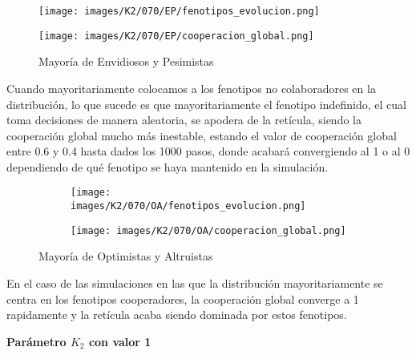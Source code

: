 \documentclass[a4paper,12pt]{report}
\begin{document}
\begin{figure}[h]
    \centering
    \begin{minipage}{0.49\textwidth}
    \centering
    \texttt{[image: images/K2/070/EP/fenotipos\_evolucion.png]}
    \label{fig:enter-label}
    \end{minipage}
    \hfill
    \begin{minipage}{0.49\textwidth}
    \centering
    \texttt{[image: images/K2/070/EP/cooperacion\_global.png]}
    \label{fig:enter-label}
    \end{minipage}
    \caption{Mayoría de Envidiosos y Pesimistas}
\end{figure}

Cuando mayoritariamente colocamos a los fenotipos no colaboradores en la distribución, lo que sucede es que mayoritariamente el fenotipo indefinido, el cual toma decisiones de manera aleatoria, se apodera de la retícula, siendo la cooperación global mucho más inestable, estando el valor de cooperación global entre 0.6 y 0.4 hasta dados los 1000 pasos, donde acabará convergiendo al 1 o al 0 dependiendo de qué fenotipo se haya mantenido en la simulación.

\newpage

\begin{figure}[h]
    \centering
    \begin{subfigure}[t]{0.49\textwidth}
        \centering
        \texttt{[image: images/K2/070/OA/fenotipos\_evolucion.png]}
        \label{fig:enter-label}
    \end{subfigure}
    \hfill
    \begin{subfigure}[t]{0.49\textwidth}
        \centering
        \texttt{[image: images/K2/070/OA/cooperacion\_global.png]}
        \label{fig:enter-label}
    \end{subfigure}
    \caption{Mayoría de Optimistas y Altruistas}
\end{figure}

En el caso de las simulaciones en las que la distribución mayoritariamente se centra en los fenotipos cooperadores, la cooperación global converge a 1 rapidamente y la retícula acaba siendo dominada por estos fenotipos.

\newpage

\vspace{1.5em}
\noindent\textbf{Parámetro \( K_2 \) con valor 1}
\vspace{0.5em}
\end{document}
